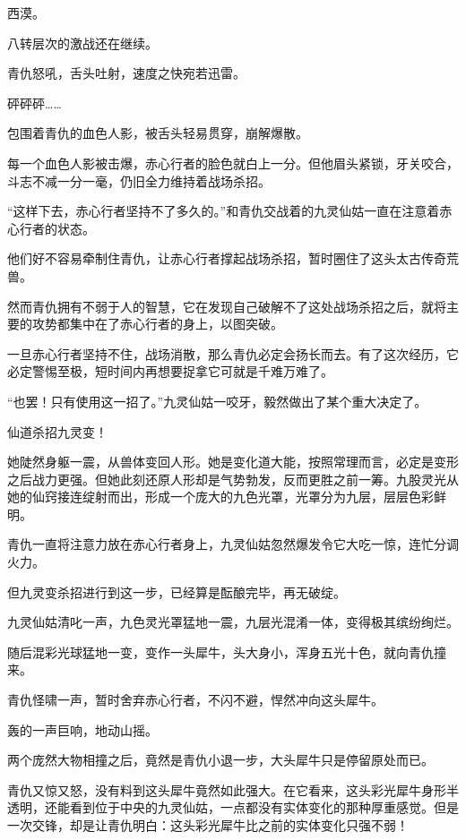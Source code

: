 
\begin{this_body}



西漠。

八转层次的激战还在继续。

青仇怒吼，舌头吐射，速度之快宛若迅雷。

砰砰砰……

包围着青仇的血色人影，被舌头轻易贯穿，崩解爆散。

每一个血色人影被击爆，赤心行者的脸色就白上一分。但他眉头紧锁，牙关咬合，斗志不减一分一毫，仍旧全力维持着战场杀招。

“这样下去，赤心行者坚持不了多久的。”和青仇交战着的九灵仙姑一直在注意着赤心行者的状态。

他们好不容易牵制住青仇，让赤心行者撑起战场杀招，暂时圈住了这头太古传奇荒兽。

然而青仇拥有不弱于人的智慧，它在发现自己破解不了这处战场杀招之后，就将主要的攻势都集中在了赤心行者的身上，以图突破。

一旦赤心行者坚持不住，战场消散，那么青仇必定会扬长而去。有了这次经历，它必定警惕至极，短时间内再想要捉拿它可就是千难万难了。

“也罢！只有使用这一招了。”九灵仙姑一咬牙，毅然做出了某个重大决定了。

仙道杀招九灵变！

她陡然身躯一震，从兽体变回人形。她是变化道大能，按照常理而言，必定是变形之后战力更强。但她此刻还原人形却是气势勃发，反而更胜之前一筹。九股灵光从她的仙窍接连绽射而出，形成一个庞大的九色光罩，光罩分为九层，层层色彩鲜明。

青仇一直将注意力放在赤心行者身上，九灵仙姑忽然爆发令它大吃一惊，连忙分调火力。

但九灵变杀招进行到这一步，已经算是酝酿完毕，再无破绽。

九灵仙姑清叱一声，九色灵光罩猛地一震，九层光混淆一体，变得极其缤纷绚烂。

随后混彩光球猛地一变，变作一头犀牛，头大身小，浑身五光十色，就向青仇撞来。

青仇怪啸一声，暂时舍弃赤心行者，不闪不避，悍然冲向这头犀牛。

轰的一声巨响，地动山摇。

两个庞然大物相撞之后，竟然是青仇小退一步，大头犀牛只是停留原处而已。

青仇又惊又怒，没有料到这头犀牛竟然如此强大。在它看来，这头彩光犀牛身形半透明，还能看到位于中央的九灵仙姑，一点都没有实体变化的那种厚重感觉。但是一次交锋，却是让青仇明白：这头彩光犀牛比之前的实体变化只强不弱！


\end{this_body}
